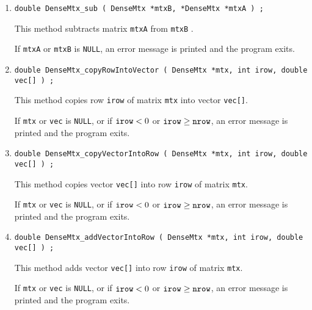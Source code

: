 \begin{enumerate}
\item
\begin{verbatim}
double DenseMtx_sub ( DenseMtx *mtxB, *DenseMtx *mtxA ) ;
\end{verbatim}
This method subtracts matrix {\tt mtxA} from {\tt mtxB} .
\par {}
If {\tt mtxA} or {\tt mtxB} is {\tt NULL},
an error message is printed and the program exits.
\item
\begin{verbatim}
double DenseMtx_copyRowIntoVector ( DenseMtx *mtx, int irow, double vec[] ) ;
\end{verbatim}
This method copies row {\tt irow} of  matrix {\tt mtx} into vector
{\tt vec[]}.
\par {}
If {\tt mtx} or {\tt vec} is {\tt NULL},
or if ${\tt irow} < 0$ or ${\tt irow} \ge {\tt nrow}$,
an error message is printed and the program exits.
\item
\begin{verbatim}
double DenseMtx_copyVectorIntoRow ( DenseMtx *mtx, int irow, double vec[] ) ;
\end{verbatim}
This method copies vector {\tt vec[]} into row {\tt irow} 
of  matrix {\tt mtx}.
\par {}
If {\tt mtx} or {\tt vec} is {\tt NULL},
or if ${\tt irow} < 0$ or ${\tt irow} \ge {\tt nrow}$,
an error message is printed and the program exits.
\item
\begin{verbatim}
double DenseMtx_addVectorIntoRow ( DenseMtx *mtx, int irow, double vec[] ) ;
\end{verbatim}
This method adds vector {\tt vec[]} into row {\tt irow} 
of  matrix {\tt mtx}.
\par {}
If {\tt mtx} or {\tt vec} is {\tt NULL},
or if ${\tt irow} < 0$ or ${\tt irow} \ge {\tt nrow}$,
an error message is printed and the program exits.
\end{enumerate}
\par

